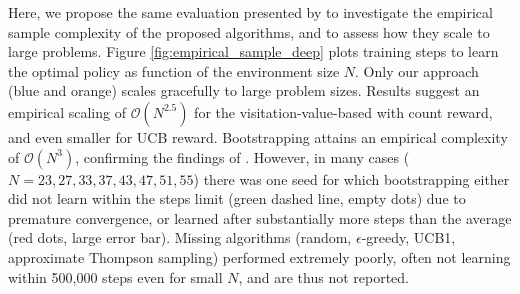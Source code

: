 \documentclass{article}
\newcommand{\bigO}{\mathcal{O}}
\begin{document}
Here, we propose the same evaluation presented by \citet{osband2018randomized} to investigate the empirical sample complexity of the proposed algorithms, and to assess how they scale to large problems. 
Figure \ref{fig:empirical_sample_deep} plots training steps to learn the optimal policy as function of the environment size $N$.
Only our approach (blue and orange) scales gracefully to large problem sizes. Results suggest an empirical scaling of $\bigO(N^{2.5})$ for the visitation-value-based with count reward, and even smaller for UCB reward. 
Bootstrapping attains an empirical complexity of $\bigO(N^{3})$, confirming the findings of \citet{osband2019deep}.
However, in many cases ($N = 23, 27, 33, 37, 43, 47, 51, 55$) there was one seed for which bootstrapping either did not learn within the steps limit (green dashed line, empty dots) due to premature convergence, or learned after substantially more steps than the average (red dots, large error bar). 
Missing algorithms (random, $\epsilon$-greedy, UCB1, approximate Thompson sampling) performed extremely poorly, often not learning within 500,000 steps even for small $N$, and are thus not reported.
\end{document}
